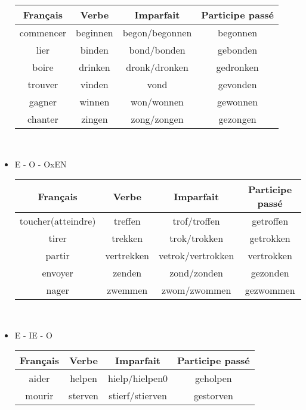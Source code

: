 \documentclass[a4paper]{article}
\begin{document}
\begin{itemize}[label=\textbullet, font=\Large]
  \begin{center}
    \begin{tabular}{|c|c|c|c|}
      \hline
      \textbf{Français} & \textbf{Verbe} & \textbf{Imparfait} & \textbf{Participe passé}\\
      \hline
      commencer & beginnen & begon/begonnen & begonnen\\
      \hline
      lier & binden & bond/bonden & gebonden\\
      \hline
      boire & drinken & dronk/dronken & gedronken\\
      \hline
      trouver & vinden & vond & gevonden\\
      \hline
      gagner & winnen & won/wonnen & gewonnen\\
      \hline
      chanter & zingen & zong/zongen & gezongen\\
      \hline
    \end{tabular}\\
  \end{center}
  \item E - O - OxEN
  \begin{center}
    \begin{tabular}{|c|c|c|c|}
      \hline
      \textbf{Français} & \textbf{Verbe} & \textbf{Imparfait} & \textbf{Participe passé}\\
      \hline
      toucher(atteindre) & treffen & trof/troffen & getroffen\\
      \hline
      tirer & trekken & trok/trokken & getrokken\\
      \hline
      partir & vertrekken & vetrok/vertrokken & vertrokken\\
      \hline
      envoyer & zenden & zond/zonden & gezonden\\
      \hline
      nager & zwemmen & zwom/zwommen & gezwommen\\
      \hline
    \end{tabular}\\
  \end{center}
  \item E - IE - O
  \begin{center}
    \begin{tabular}{|c|c|c|c|}
      \hline
      \textbf{Français} & \textbf{Verbe} & \textbf{Imparfait} & \textbf{Participe passé}\\
      \hline
      aider & helpen & hielp/hielpen0 & geholpen\\
      \hline
      mourir & sterven & stierf/stierven & gestorven\\

\end{tabular}
\end{center}
\end{itemize}
\end{document}
